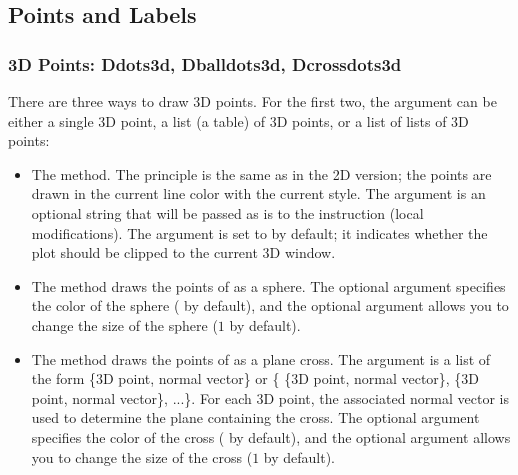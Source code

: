 \subsection{Points and Labels}

\subsubsection{3D Points: Ddots3d, Dballdots3d, Dcrossdots3d}

There are three ways to draw 3D points. For the first two, the argument  can be either a single 3D point, a list (a table) of 3D points, or a list of lists of 3D points:

\begin{itemize}
    \item The  method. The principle is the same as in the 2D version; the points are drawn in the current line color with the current style. The  argument is an optional string that will be passed as is to the \drawcmd instruction (local modifications). The  argument is set to \false by default; it indicates whether the plot should be clipped to the current 3D window.

    \item The  method draws the points of  as a sphere. The optional  argument specifies the color of the sphere ( by default), and the optional  argument allows you to change the size of the sphere ($1$ by default).

    \item The  method draws the points of  as a plane cross. The argument  is a list of the form \{3D point, normal vector\} or \{ \{3D point, normal vector\}, \{3D point, normal vector\}, ...\}. For each 3D point, the associated normal vector is used to determine the plane containing the cross. The optional  argument specifies the color of the cross ( by default), and the optional  argument allows you to change the size of the cross ($1$ by default).
\end{itemize}

